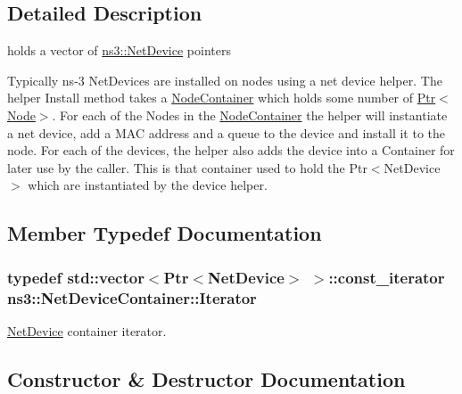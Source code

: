 \subsection{Detailed Description}
holds a vector of \hyperlink{classns3_1_1NetDevice}{ns3\+::\+Net\+Device} pointers 

Typically ns-\/3 Net\+Devices are installed on nodes using a net device helper. The helper Install method takes a \hyperlink{classns3_1_1NodeContainer}{Node\+Container} which holds some number of \hyperlink{classns3_1_1Ptr}{Ptr$<$\+Node$>$}. For each of the Nodes in the \hyperlink{classns3_1_1NodeContainer}{Node\+Container} the helper will instantiate a net device, add a M\+AC address and a queue to the device and install it to the node. For each of the devices, the helper also adds the device into a Container for later use by the caller. This is that container used to hold the Ptr$<$\+Net\+Device$>$ which are instantiated by the device helper. 

\subsection{Member Typedef Documentation}
\subsubsection[{\texorpdfstring{Iterator}{Iterator}}]{\setlength{\rightskip}{0pt plus 5cm}typedef std\+::vector$<${\bf Ptr}$<${\bf Net\+Device}$>$ $>$\+::const\+\_\+iterator {\bf ns3\+::\+Net\+Device\+Container\+::\+Iterator}}\hypertarget{classns3_1_1NetDeviceContainer_a45709bb572f975569ed985fa89b132f8}{}\label{classns3_1_1NetDeviceContainer_a45709bb572f975569ed985fa89b132f8}


\hyperlink{classns3_1_1NetDevice}{Net\+Device} container iterator. 



\subsection{Constructor \& Destructor Documentation}
